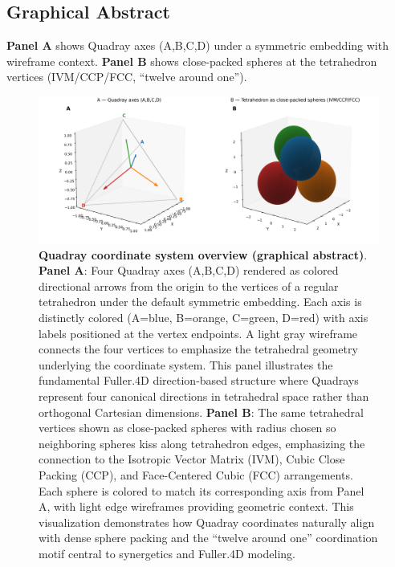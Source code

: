 \documentclass[
  10pt,
]{article}
\begin{document}
\hypertarget{graphical-abstract}{%
\subsection{Graphical Abstract}\label{graphical-abstract}}

\textbf{Panel A} shows Quadray axes (A,B,C,D) under a symmetric
embedding with wireframe context. \textbf{Panel B} shows close-packed
spheres at the tetrahedron vertices (IVM/CCP/FCC, ``twelve around
one'').

\begin{figure}
\centering
\includegraphics{../output/figures/graphical_abstract_quadray.png}
\caption{\textbf{Quadray coordinate system overview (graphical
abstract)}. \textbf{Panel A}: Four Quadray axes (A,B,C,D) rendered as
colored directional arrows from the origin to the vertices of a regular
tetrahedron under the default symmetric embedding. Each axis is
distinctly colored (A=blue, B=orange, C=green, D=red) with axis labels
positioned at the vertex endpoints. A light gray wireframe connects the
four vertices to emphasize the tetrahedral geometry underlying the
coordinate system. This panel illustrates the fundamental Fuller.4D
direction-based structure where Quadrays represent four canonical
directions in tetrahedral space rather than orthogonal Cartesian
dimensions. \textbf{Panel B}: The same tetrahedral vertices shown as
close-packed spheres with radius chosen so neighboring spheres kiss
along tetrahedron edges, emphasizing the connection to the Isotropic
Vector Matrix (IVM), Cubic Close Packing (CCP), and Face-Centered Cubic
(FCC) arrangements. Each sphere is colored to match its corresponding
axis from Panel A, with light edge wireframes providing geometric
context. This visualization demonstrates how Quadray coordinates
naturally align with dense sphere packing and the ``twelve around one''
coordination motif central to synergetics and Fuller.4D modeling.}
\end{figure}
\end{document}
